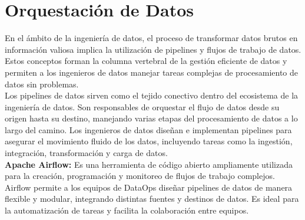 \documentclass[12pt]{book}
\begin{document}






\section{Orquestación de Datos}
En el ámbito de la ingeniería de datos, el proceso de transformar datos brutos en información valiosa implica la utilización de pipelines y flujos de trabajo de datos. Estos conceptos forman la columna vertebral de la gestión eficiente de datos y permiten a los ingenieros de datos manejar tareas complejas de procesamiento de datos sin problemas.\\
Los pipelines de datos sirven como el tejido conectivo dentro del ecosistema de la ingeniería de datos. Son responsables de orquestar el flujo de datos desde su origen hasta su destino, manejando varias etapas del procesamiento de datos a lo largo del camino. Los ingenieros de datos diseñan e implementan pipelines para asegurar el movimiento fluido de los datos, incluyendo tareas como la ingestión, integración, transformación y carga de datos.\\

\textbf{Apache Airflow:} Es una herramienta de código abierto ampliamente utilizada para la creación, programación y monitoreo de flujos de trabajo complejos. Airflow permite a los equipos de DataOps diseñar pipelines de datos de manera flexible y modular, integrando distintas fuentes y destinos de datos. Es ideal para la automatización de tareas y facilita la colaboración entre equipos.
\end{document}
